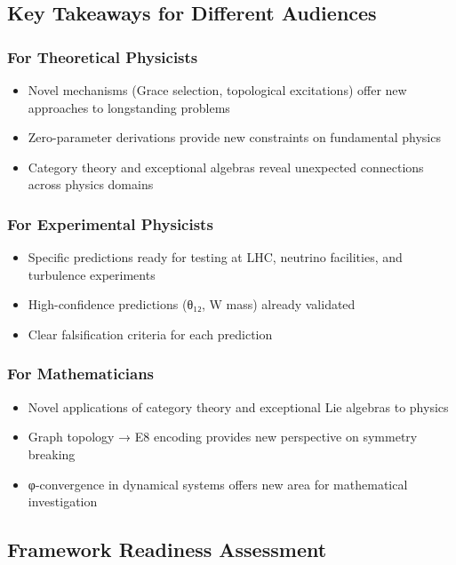 \documentclass[12pt,a4paper]{article}
\begin{document}
\begin{itemize}
\begin{itemize}
\subsection*{Key Takeaways for Different Audiences}

\subsubsection{For Theoretical Physicists}
\begin{itemize}
\item Novel mechanisms (Grace selection, topological excitations) offer new approaches to longstanding problems
\item Zero-parameter derivations provide new constraints on fundamental physics
\item Category theory and exceptional algebras reveal unexpected connections across physics domains
\end{itemize}

\subsubsection{For Experimental Physicists}
\begin{itemize}
\item Specific predictions ready for testing at LHC, neutrino facilities, and turbulence experiments
\item High-confidence predictions (θ₁₂, W mass) already validated
\item Clear falsification criteria for each prediction
\end{itemize}

\subsubsection{For Mathematicians}
\begin{itemize}
\item Novel applications of category theory and exceptional Lie algebras to physics
\item Graph topology → E8 encoding provides new perspective on symmetry breaking
\item φ-convergence in dynamical systems offers new area for mathematical investigation
\end{itemize}

\subsection*{Framework Readiness Assessment}


\end{itemize}
\end{itemize}
\end{document}
